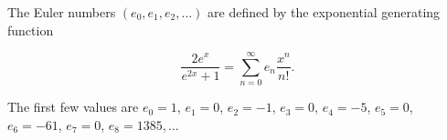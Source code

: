 The Euler numbers $(e_0, e_1, e_2, \ldots)$ are defined by the exponential generating function

$$\frac{2e^x}{e^{2x} + 1} = \sum_{n=0}^{\infty} e_n \frac{x^n}{n!}.$$

The first few values are $e_0 = 1$, $e_1 = 0$, $e_2 = -1$, $e_3 = 0$, $e_4 = -5$, $e_5 = 0$, $e_6 = -61$, $e_7 = 0$, $e_8 = 1385, \ldots$
